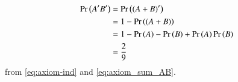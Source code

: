 \begin{align}
\pr{A^\prime B^\prime} &= \pr{(A+B)^\prime} \\
		  &= 1 - \pr{(A+B)} \\
		  &= 1 - \pr{A} - \pr{B} + \pr{A}\pr{B} \\
		  \label{eq:12.13.3.69/8}&= \frac{2}{9}
\end{align}
from 
\eqref{eq:axiom-ind}
and
\eqref{eq:axiom_sum_AB}.

